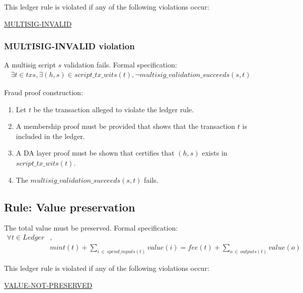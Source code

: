 \documentclass[../midgard.tex]{subfiles}
\begin{document}
\todo

This ledger rule is violated if any of the following violations occur:
\begin{itemize-multi}
  \item \hyperref[violation:MULTISIG-INVALID]{MULTISIG-INVALID}
\end{itemize-multi}

\subsubsection{MULTISIG-INVALID violation}
\label{violation:MULTISIG-INVALID}
A multisig script $s$ validation fails.
Formal specification:
\begin{equation*}
\begin{split}
  \exists t \in txs, \exists (h, s) \in script\_tx\_wits(t), \lnot multisig\_validation\_succeeds(s, t)
\end{split}
\end{equation*}

Fraud proof construction:
\begin{enumerate}
  \item Let $t$ be the transaction alleged to violate the ledger rule. 
  \item A membership proof must be provided that shows that the transaction $t$ is included in the ledger.
  \item A DA layer proof must be shown that certifies that $(h, s)$ exists in $script\_tx\_wits(t)$.
  \item The $multisig\_validation\_succeeds(s, t)$ fails.
\end{enumerate}

\subsection{Rule: Value preservation}
\label{rule:value-preservation}
The total value must be preserved.
Formal specification:
\begin{equation*}
\begin{split}
    \forall t \in Ledger &, \\
    & mint(t) + \sum_{i \, \in \, spend\_inputs(t)} value(i) = fee(t) + \sum_{o \, \in \, outputs(t)} value(o)
\end{split}
\end{equation*}
        
This ledger rule is violated if any of the following violations occur:
\begin{itemize-multi}
  \item \hyperref[violation:VALUE-NOT-PRESERVED]{VALUE-NOT-PRESERVED}
\end{itemize-multi}
\end{document}

